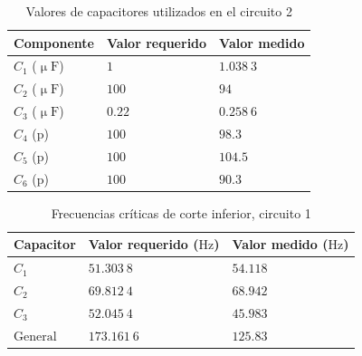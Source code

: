 \documentclass[journal]{IEEEtran}
\begin{document}
\begin{table}[H]
        \centering
        \renewcommand{\arraystretch}{1.5}
        \caption{Valores de capacitores utilizados en el circuito 2}
        \begin{tabular}{ >{\centering\arraybackslash}m{2.5cm} >{\centering\arraybackslash}m{2.5cm} >{\centering\arraybackslash}m{2.5cm} }
                \hline
            Componente & Valor requerido & Valor medido\\ 
            \hline
            \centering
            $C_1$ ($\upmu\mathrm{F}$) & $1$  & $1.038~3$  \\ 
            $C_2$ ($\upmu\mathrm{F}$) & $100$  & $94$ \\
            $C_3$ ($\upmu\mathrm{F}$) & $0.22$  & $0.258~6$ \\
            $C_4$ ($\mathrm{p}$) & $100$ & $98.3$ \\
            $C_5$ ($\mathrm{p}$) & $100$ & $104.5$ \\
            $C_6$ ($\mathrm{p}$) & $100$ & $90.3$ \\
            \hline
        \end{tabular}
        \label{tabla3}
    \end{table}   

\begin{table}[H]
        \centering
        \renewcommand{\arraystretch}{1.5}
        \caption{Frecuencias críticas de corte inferior, circuito 1}
        \begin{tabular}{ >{\centering\arraybackslash}m{2.5cm} >{\centering\arraybackslash}m{2.5cm} >{\centering\arraybackslash}m{2.5cm} }
                \hline
            Capacitor & Valor requerido ($\mathrm{Hz}$) & Valor medido ($\mathrm{Hz}$)\\ 
            \hline
            \centering
            $C_1$ & $51.303~8$  & $54.118$  \\ 
            $C_2$ & $69.812~4$  & $68.942$ \\
            $C_3$ & $52.045~4$  & $45.983$ \\
            $\mathrm{General}$ & $173.161~6$  & $125.83$ \\
            \hline
        \end{tabular}
        \label{tabla4}
    \end{table}    
\end{document}
